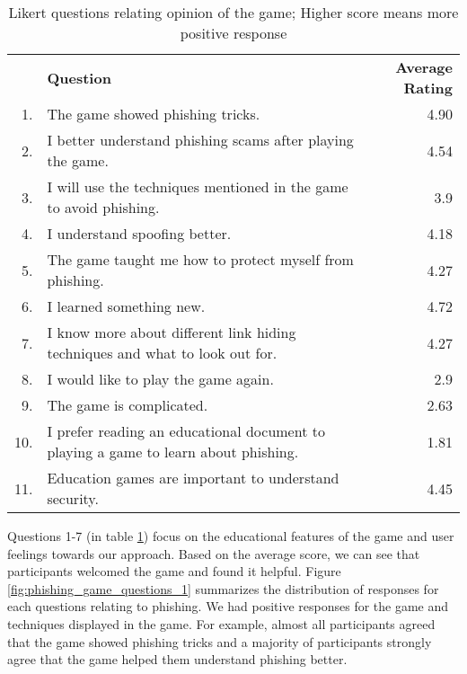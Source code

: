\begin{table}[!ht]
    \centering
    \begin{tabular}{|r p{} r|}
        \hline
            & \textbf{Question}                                                                   & \textbf{Average Rating} \\
        1.  & The game showed phishing tricks.                                                    & 4.90                    \\
        2.  & I better understand phishing scams after playing the game.                          & 4.54                    \\
        3.  & I will use the techniques mentioned in the game to avoid phishing.                  & 3.9                     \\
        4.  & I understand spoofing better.                                                       & 4.18                    \\
        5.  & The game taught me how to protect myself from phishing.                             & 4.27                    \\
        6.  & I learned something new.                                                            & 4.72                    \\
        7.  & I know more about different link hiding techniques and what to look out for.        & 4.27                    \\
        \hline
        8.  & I would like to play the game again.                                                & 2.9                     \\
        9.  & The game is complicated.                                                            & 2.63                    \\
        10. & I prefer reading an educational document to playing a game to learn about phishing. & 1.81                    \\
        11. & Education games are important to understand security.                               & 4.45                    \\
        \hline
    \end{tabular}
    \caption{Likert questions relating opinion of the game; Higher score means more positive response}
    \label{tab:game_questions}
\end{table}

Questions 1-7 (in table \ref{tab:game_questions}) focus on the educational features of the game and user feelings towards our approach. Based on the average score, we can see that participants welcomed the game and found it helpful. Figure \ref{fig:phishing_game_questions_1} summarizes the distribution of responses for each questions relating to phishing. We had positive responses for the game and techniques displayed in the game. For example, almost all participants agreed that the game showed phishing tricks and a majority of participants strongly agree that the game helped them understand phishing better.

